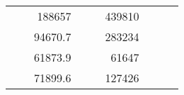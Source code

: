 \begin{table}[]
\begin{tabular}{|ccrccrccr}
\multicolumn{1}{|c|}{\cellcolor[HTML]{FFFFC7}}                                & \multicolumn{1}{c|}{\cellcolor[HTML]{DDFDFF}}                      & \multicolumn{1}{r|}{\cellcolor[HTML]{DAE8FC}188657}    & \multicolumn{1}{c|}{\cellcolor[HTML]{FFFFC7}}                                & \multicolumn{1}{c|}{\cellcolor[HTML]{DDFDFF}}                       & \multicolumn{1}{r|}{\cellcolor[HTML]{DDFDFF}439810}    &                                                                              &                                                                    &                                                        \\ \cline{3-3} \cline{6-6}
\multicolumn{1}{|c|}{\cellcolor[HTML]{FFFFC7}}                                & \multicolumn{1}{c|}{\cellcolor[HTML]{DDFDFF}}                      & \multicolumn{1}{r|}{\cellcolor[HTML]{DDFDFF}94670.7}   & \multicolumn{1}{c|}{\cellcolor[HTML]{FFFFC7}}                                & \multicolumn{1}{c|}{\cellcolor[HTML]{DDFDFF}}                       & \multicolumn{1}{r|}{\cellcolor[HTML]{DAE8FC}283234}    &                                                                              &                                                                    &                                                        \\ \cline{3-3} \cline{6-6}
\multicolumn{1}{|c|}{\cellcolor[HTML]{FFFFC7}}                                & \multicolumn{1}{c|}{\cellcolor[HTML]{DDFDFF}}                      & \multicolumn{1}{r|}{\cellcolor[HTML]{DAE8FC}61873.9}   & \multicolumn{1}{c|}{\cellcolor[HTML]{FFFFC7}}                                & \multicolumn{1}{c|}{\cellcolor[HTML]{DDFDFF}}                       & \multicolumn{1}{r|}{\cellcolor[HTML]{DDFDFF}61647}     &                                                                              &                                                                    &                                                        \\ \cline{3-3} \cline{6-6}
\multicolumn{1}{|c|}{\cellcolor[HTML]{FFFFC7}}                                & \multicolumn{1}{c|}{\cellcolor[HTML]{DDFDFF}}                      & \multicolumn{1}{r|}{\cellcolor[HTML]{DDFDFF}71899.6}   & \multicolumn{1}{c|}{\cellcolor[HTML]{FFFFC7}}                                & \multicolumn{1}{c|}{\cellcolor[HTML]{DDFDFF}}                       & \multicolumn{1}{r|}{\cellcolor[HTML]{DAE8FC}127426}    &                                                                              &                                                                    &                                                        \\ \cline{3-3} \cline{6-6}

\end{tabular}
\end{table}
